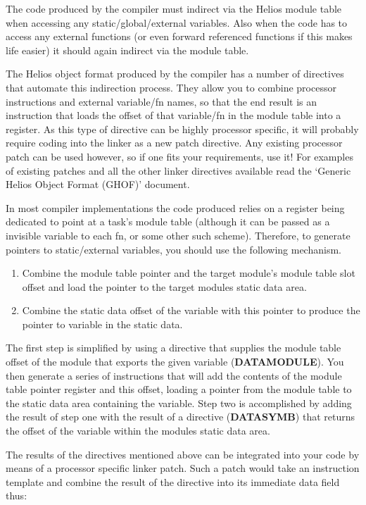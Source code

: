 The code produced by the compiler must indirect via the Helios module table
when accessing any static/global/external variables. Also when the code has
to access any external functions (or even forward referenced functions if this
makes life easier) it should again indirect via the module table.

The Helios object format produced by the compiler has a number
of directives that automate this indirection process. They allow you to
combine processor instructions and external variable/fn names, so that
the end result is an instruction that loads the offset of that variable/fn
in the module table into a register.
As this type of directive can be highly processor specific, it will probably
require coding into the linker as a new patch directive. Any existing
processor patch can be used however, so if one fits your requirements,
use it! For examples of existing
patches and all the other linker directives available read the
`Generic Helios Object Format (GHOF)' document.

In most compiler implementations the code produced relies on a register
being dedicated to point at a task's module table (although it can be passed
as a invisible variable to each fn, or some other such scheme).
Therefore, to generate pointers to static/external variables,
you should use the following mechanism.
\begin{enumerate}
\item Combine the module table pointer and the target module's module table slot
offset and load the pointer to the target modules static data area.

\item Combine the static data offset of the variable with this pointer
to produce the pointer to variable in the static data.
\end{enumerate}

The first step is simplified by using a directive that supplies the
module table offset of the module that exports the given variable
({\bf DATAMODULE}). You then
generate a series of instructions that will add the contents of
the module table pointer register and this offset, loading a pointer from
the module table to the static data area containing the variable.
Step two is accomplished by adding the result of step one with the result of a
directive ({\bf DATASYMB}) that returns the offset of the variable
within the modules static data area.

The results of the directives mentioned above can be integrated into your
code by means of a processor specific linker patch. Such a patch would
take an instruction template and combine the result of the directive into its
immediate data field thus:

